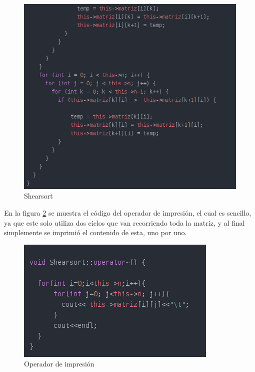 \documentclass[11pt]{article}
\begin{document}
\begin{figure}[H]
\centering
\includegraphics[scale=0.8]{s2.png}
\caption{Shearsort}
\label{fig:3}
\end{figure}

En la figura \ref{fig:4} se muestra el código del operador de impresión, el cual es sencillo, ya que este solo utiliza dos ciclos que van recorriendo toda la matriz, y al final simplemente se imprimió el contenido de esta, uno por uno.

\begin{figure}[H]
\centering
\includegraphics[scale=1]{operator.png}
\caption{Operador de impresión}
\label{fig:4}
\end{figure}
\end{document}
